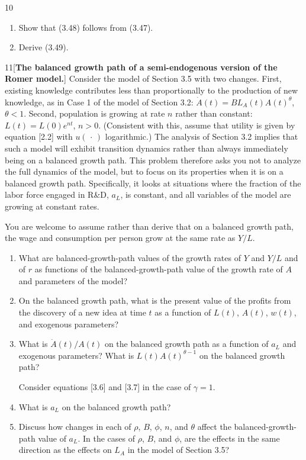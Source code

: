 \begin{problem}{10}
\begin{enumerate}[label=(\alph*)]
    \item Show that (3.48) follows from (3.47).
    \item Derive (3.49).
\end{enumerate}
\end{problem}

\begin{problem}{11}[\textbf{The balanced growth path of a semi-endogenous version of the Romer model.}]
Consider the model of Section 3.5 with two changes. First, existing knowledge contributes less than proportionally to the production of new knowledge, as in Case 1 of the model of Section 3.2: \(\dot{A}\left(t\right)=BL_A\left(t\right)A\left(t\right)^\theta\), \(\theta<1\). Second, population is growing at rate \(n\) rather than constant: \(L\left(t\right)=L\left(0\right)e^{nt}\), \(n>0\). (Consistent with this, assume that utility is given by equation [2.2] with \(u\left(\,\cdot\,\right)\) logarithmic.) The analysis of Section 3.2 implies that such a model will exhibit transition dynamics rather than always immediately being on a balanced growth path. This problem therefore asks you not to analyze the full dynamics of the model, but to focus on its properties when it is on a balanced growth path. Specifically, it looks at situations where the fraction of the labor force engaged in R\&D, \(a_L\), is constant, and all variables of the model are growing at constant rates.
\par {} You are welcome to assume rather than derive that on a balanced growth path, the wage and consumption per person grow at the same rate as \(Y/L\).
\begin{enumerate}[label=(\alph*)]
    \item What are balanced-growth-path values of the growth rates of \(Y\) and \(Y/L\) and of \(r\) as functions of the balanced-growth-path value of the growth rate of \(A\) and parameters of the model?
    \item On the balanced growth path, what is the present value of the profits from the discovery of a new idea at time \(t\) as a function of \(L\left(t\right)\), \(A\left(t\right)\), \(w\left(t\right)\), and exogenous parameters?
    \item What is \(\dot{A}\left(t\right)/A\left(t\right)\) on the balanced growth path as a function of \(a_L\) and exogenous parameters? What is \(L\left(t\right)A\left(t\right)^{\theta-1}\) on the balanced growth path?
    \par {} Consider equations [3.6] and [3.7] in the case of \(\gamma=1\).
    \item What is \(a_L\) on the balanced growth path?
    \item Discuss how changes in each of \(\rho\), \(B\), \(\phi\), \(n\), and \(\theta\) affect the balanced-growth-path value of \(a_L\). In the cases of \(\rho\), \(B\), and \(\phi\), are the effects in the same direction as the effects on \(L_A\) in the model of Section 3.5?
\end{enumerate}
\end{problem}

